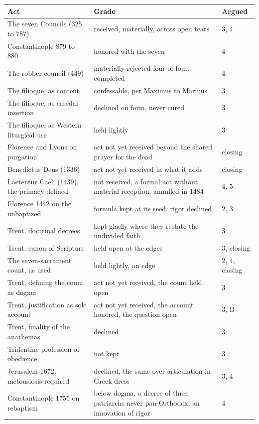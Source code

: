 \documentclass[11pt,twoside]{article}
\newlength{\actcol}
\newlength{\gradecol}
\begin{document}
\medskip
\small
\begin{longtable}{>{\raggedright\arraybackslash}p{\actcol}>{\raggedright\arraybackslash}p{\gradecol}l}
\textbf{Act} & \textbf{Grade} & \textbf{Argued} \\
\hline
\endhead
The seven Councils (325 to 787) & received, materially, across open tears & 3, 4 \\
Constantinople 879 to 880 & honored with the seven & 4 \\
The robber council (449) & materially rejected four of four, completed & 4 \\
The filioque, as content & confessable, per Maximus to Marinus & 3 \\
The filioque, as creedal insertion & declined on form, never cured & 3 \\
The filioque, as Western liturgical use & held lightly & 3 \\
Florence and Lyons on purgation & act not yet received beyond the shared prayer for the dead & closing \\
Benedictus Deus (1336) & act not yet received in what it adds & closing \\
Laetentur Caeli (1439), the primacy defined & not received, a formal act without material reception, annulled in 1484 & 4, 5 \\
Florence 1442 on the unbaptized & formula kept at its seed, rigor declined & 2, 3 \\
Trent, doctrinal decrees & kept gladly where they restate the undivided faith & 3 \\
Trent, canon of Scripture & held open at the edges & 3, closing \\
The seven-sacrament count, as used & held lightly, an edge & 2, 4, closing \\
Trent, defining the count as dogma & act not yet received, the count held open & 3 \\
Trent, justification as sole account & act not yet received, the account honored, the question open & 3, B \\
Trent, finality of the anathemas & declined & 3 \\
Tridentine profession of obedience & not kept & 3 \\
Jerusalem 1672, metousiosis required & declined, the same over-articulation in Greek dress & 3, 4 \\
Constantinople 1755 on rebaptism & below dogma, a decree of three patriarchs never pan-Orthodox, an innovation of rigor & 4 \\

\end{longtable}
\end{document}
